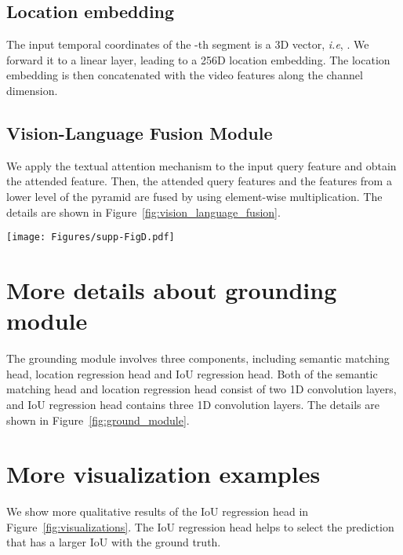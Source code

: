 \documentclass[10pt,twocolumn,letterpaper]{article}
\def\ie{\emph{i.e}\onedot} \def\Ie{\emph{I.e}\onedot}
\begin{document}
\subsection{Location embedding}

The input temporal coordinates of the -th segment is a 3D vector, \ie, . We forward it to a linear layer, leading to a 256D location embedding. The location embedding is then concatenated with the video features along the channel dimension.




\subsection{Vision-Language Fusion Module}

We apply the textual attention mechanism to the input query feature and obtain the attended feature. Then, the attended query features and the features from a lower level of the pyramid are fused by using element-wise multiplication. The details are shown in Figure~\ref{fig:vision_language_fusion}.




\begin{figure*}[!t]
	\centering
	\texttt{[image: Figures/supp-FigD.pdf]}
	\centering
\caption{Qualitative results.}
	\label{fig:visualizations}
\end{figure*}

\section{More details about grounding module}
\label{sec:grounding}

The grounding module involves three components, including semantic matching head, location regression head and IoU regression head.
Both of the semantic matching head and location regression head consist of two 1D convolution layers, and IoU regression head contains three 1D convolution layers. 
The details are shown in Figure~\ref{fig:ground_module}.

\section{More visualization examples}
\label{sec:visual}

We show more qualitative results of the IoU regression head in Figure~\ref{fig:visualizations}. The IoU regression head helps to select the prediction that has a larger IoU with the ground truth.
\end{document}
